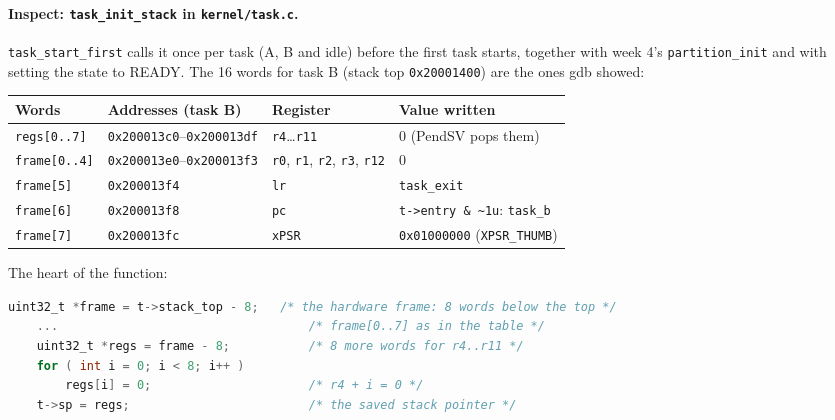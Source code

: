 \paragraph{Inspect: \texttt{task\_init\_stack} in \texttt{kernel/task.c}.} \texttt{task\_start\_first} calls it once per task (A, B and idle) before the first task starts, together with week 4's \texttt{partition\_init} and with setting the state to READY. The 16 words for task B (stack top \texttt{0x20001400}) are the ones gdb showed:
\begin{center}
    \begin{tabular}{l l l l}
        \hline
        \textbf{Words} & \textbf{Addresses (task B)} & \textbf{Register} & \textbf{Value written} \\
        \hline
        \texttt{regs[0..7]} & \texttt{0x200013c0}--\texttt{0x200013df} & \texttt{r4}\ldots\texttt{r11} & 0 (PendSV pops them) \\
        \texttt{frame[0..4]} & \texttt{0x200013e0}--\texttt{0x200013f3} & \texttt{r0}, \texttt{r1}, \texttt{r2}, \texttt{r3}, \texttt{r12} & 0 \\
        \texttt{frame[5]} & \texttt{0x200013f4} & \texttt{lr} & \texttt{task\_exit} \\
        \texttt{frame[6]} & \texttt{0x200013f8} & \texttt{pc} & \texttt{t->entry \& \textasciitilde 1u}: \texttt{task\_b} \\
        \texttt{frame[7]} & \texttt{0x200013fc} & \texttt{xPSR} & \texttt{0x01000000} (\texttt{XPSR\_THUMB}) \\
        \hline
    \end{tabular}
\end{center}

The heart of the function:
\begin{lstlisting}[language=C]
    uint32_t *frame = t->stack_top - 8;   /* the hardware frame: 8 words below the top */
    ...                                   /* frame[0..7] as in the table */
    uint32_t *regs = frame - 8;           /* 8 more words for r4..r11 */
    for ( int i = 0; i < 8; i++ )
        regs[i] = 0;                      /* r4 + i = 0 */
    t->sp = regs;                         /* the saved stack pointer */
\end{lstlisting}


